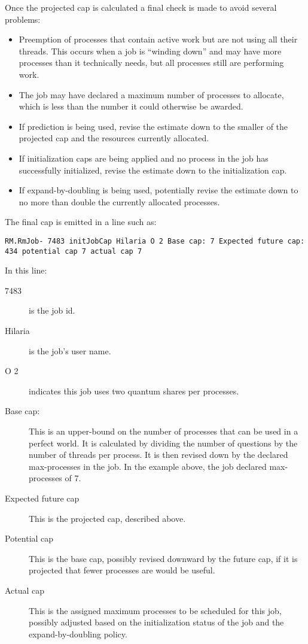    Once the projected cap is calculated a final check is made to avoid several problems:
   \begin{itemize}
     \item Preemption of processes that contain active work but are not using all their
       threads.  This occurs when a job is ``winding down'' and may have more
       processes than it technically needs, but all processes still are performing work.
     \item The job may have declared a maximum number of processes to allocate, which is
       less than the number it could otherwise be awarded.
     \item If prediction is being used, revise the estimate down to the smaller
       of the projected cap and the resources currently allocated.
     \item If initialization caps are being applied and no process in the job has
       successfully initialized, revise the estimate down to the initialization cap.
     \item If expand-by-doubling is being used, potentially revise the estimate down
       to no more than double the currently allocated processes.
   \end{itemize}

   The final cap is emitted in a line such as:
\begin{verbatim}
RM.RmJob- 7483 initJobCap Hilaria O 2 Base cap: 7 Expected future cap: 434 potential cap 7 actual cap 7
\end{verbatim}
    In this line:
    \begin{description}
      \item[7483] is the job id.
      \item[Hilaria] is the job's user name.
      \item[O 2] indicates this job uses two quantum shares per processes.
      \item[Base cap:] This is an upper-bound on the number of processes
        that can be used in a perfect world.  It is calculated by 
        dividing the number of questions by the number of threads per
        process.  It is then revised down by the declared max-processes
        in the job.  In the example above, the job declared
        max-processes of 7.
      \item[Expected future cap] This is the projected cap, described above.
      \item[Potential cap] This is the base cap, possibly revised downward
        by the future cap, if it is projected that fewer processes are
        would be useful.
      \item[Actual cap] This is the assigned maximum processes to be
        scheduled for this job, possibly adjusted based on the
        initialization status of the job and the expand-by-doubling policy.        
    \end{description}

